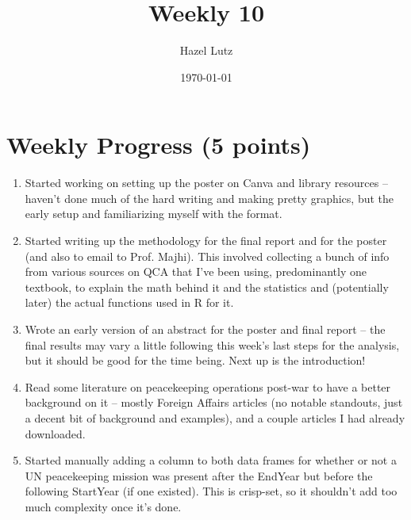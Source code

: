 \documentclass[10pt]{article}
\title{Weekly 10}
\author{Hazel Lutz}
\date{\today}
\begin{document}
\maketitle


\section*{Weekly Progress (5 points)}
\begin{enumerate}
	\item Started working on setting up the poster on Canva and library resources -- haven't done much of the hard writing and making pretty graphics, but the early setup and familiarizing myself with the format.
	\item Started writing up the methodology for the final report and for the poster (and also to email to Prof. Majhi). This involved collecting a bunch of info from various sources on QCA that I've been using, predominantly one textbook, to explain the math behind it and the statistics and (potentially later) the actual functions used in R for it.
	\item Wrote an early version of an abstract for the poster and final report -- the final results may vary a little following this week's last steps for the analysis, but it should be good for the time being. Next up is the introduction!
	\item Read some literature on peacekeeping operations post-war to have a better background on it -- mostly Foreign Affairs articles (no notable standouts, just a decent bit of background and examples), and a couple articles I had already downloaded.
	\item Started manually adding a column to both data frames for whether or not a UN peacekeeping mission was present after the EndYear but before the following StartYear (if one existed). This is crisp-set, so it shouldn't add too much complexity once it's done.
\end{enumerate} 
\end{document}
